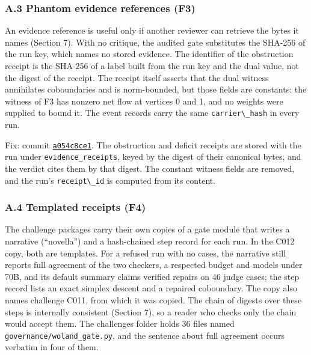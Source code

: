 \documentclass[
  11pt,
]{article}
\newcommand{\passthrough}[1]{#1}
\begin{document}
\subsubsection{A.3 Phantom evidence references
(F3)}\label{a.3-phantom-evidence-references-f3}

An evidence reference is useful only if another reviewer can retrieve
the bytes it names (Section 7). With no critique, the audited gate
substitutes the SHA-256 of the run key, which names no stored evidence.
The identifier of the obstruction receipt is the SHA-256 of a label
built from the run key and the dual value, not the digest of the
receipt. The receipt itself asserts that the dual witness annihilates
coboundaries and is norm-bounded, but those fields are constants: the
witness of F3 has nonzero net flow at vertices 0 and 1, and no weights
were supplied to bound it. The event records carry the same
\passthrough{\lstinline!carrier\_hash!} in every run.

Fix: commit
\href{https://github.com/dbccpage/the_symbol_game/commit/a054c8ce17c3025ac5518aaeef29096a299519bb}{\passthrough{\lstinline!a054c8ce1!}}.
The obstruction and deficit receipts are stored with the run under
\nolinkurl{evidence_receipts}, keyed by the digest of their canonical
bytes, and the verdict cites them by that digest. The constant witness
fields are removed, and the run's \passthrough{\lstinline!receipt\_id!}
is computed from its content.

\subsubsection{A.4 Templated receipts
(F4)}\label{a.4-templated-receipts-f4}

The challenge packages carry their own copies of a gate module that
writes a narrative (``novella'') and a hash-chained step record for each
run. In the C012 copy, both are templates. For a refused run with no
cases, the narrative still reports full agreement of the two checkers, a
respected budget and models under 70B, and its default summary claims
verified repairs on 46 judge cases; the step record lists an exact
simplex descent and a repaired coboundary. The copy also names challenge
C011, from which it was copied. The chain of digests over these steps is
internally consistent (Section 7), so a reader who checks only the chain
would accept them. The challenges folder holds 36 files named
\nolinkurl{governance/woland_gate.py}, and the sentence about full
agreement occurs verbatim in four of them.
\end{document}
